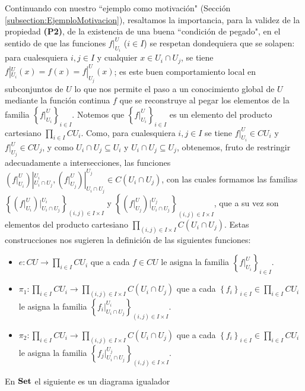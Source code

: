 Continuando con nuestro ``ejemplo como motivación" (Sección \ref{subsection:EjemploMotivacion}), resaltamos la importancia, para la validez de la propiedad \textbf{(P2)}, de la existencia de una buena ``condición de pegado", en el sentido de que las funciones $f|^{U}_{U_i}$ ($i\in I$) se respetan dondequiera que se solapen: para cualesquiera $i,j\in I$ y cualquier $x\in U_i\cap U_j$, se tiene $f|^U_{U_i}(x)=f(x)=f|^U_{U_j}(x)$; es este buen comportamiento local en subconjuntos de $U$ lo que nos permite el paso a un conocimiento global de $U$ mediante la función continua $f$ que se reconstruye al pegar los elementos de la familia $\left\lbrace f|^U_{U_i}\right\rbrace_{i\in I}$. Notemos que $\left\lbrace f|^U_{U_i}\right\rbrace_{i\in I}$ es un elemento del producto cartesiano $\prod_{i\in I} CU_i$. Como, para cualesquiera $i,j\in I$ se tiene $f|^U_{U_i}\in CU_i$ y $f|^U_{U_j}\in CU_j$, y como $U_i\cap U_j\subseteq U_i$ y $U_i\cap U_j\subseteq U_j$, obtenemos, fruto de restringir adecuadamente a intersecciones, las funciones $({f|^U_{U_i}})|^{U_i}_{U_i\cap U_j}, ({f|^U_{U_j}})|^{U_j}_{U_i\cap U_j}\in C(U_i\cap U_j)$, con las cuales formamos las familias $\left\lbrace ({f|^U_{U_i}})|^{U_i}_{U_i\cap U_j}\right\rbrace_{(i,j)\in I\times I}$ y $\left\lbrace ({f|^U_{U_j}})|^{U_j}_{U_i\cap U_j}\right\rbrace_{(i,j)\in I\times I}$, que a su vez son elementos del producto cartesiano $\prod_{(i,j)\in I\times I}C(U_i\cap U_j)$. Estas construcciones nos sugieren la definición de las siguientes funciones:
\begin{itemize}
   \item $e:CU\to \prod_{i\in I}CU_i$ que a cada $f\in CU$ le asigna la familia $\left\lbrace f|^{U}_{U_i}\right\rbrace_{i\in I}$.
   \item $\pi_1:\prod_{i\in I}CU_i\to \prod_{(i,j)\in I\times I}C(U_i\cap U_j)$ que a cada $\left\lbrace f_i\right\rbrace_{i\in I}\in\prod_{i\in I}CU_i$ le asigna la familia $\left\lbrace {f_i}|^{U_i}_{U_i\cap U_j}\right\rbrace_{(i,j)\in I\times I}$.
   \item $\pi_2:\prod_{i\in I}CU_i\to \prod_{(i,j)\in I\times I}C(U_i\cap U_j)$ que a cada $\left\lbrace f_i\right\rbrace_{i\in I}\in\prod_{i\in I}CU_i$ le asigna la familia $\left\lbrace {f_j}|^{U_j}_{U_i\cap U_j}\right\rbrace_{(i,j)\in I\times I}$.
\end{itemize}
\begin{Prop}
   En $\normalfont{\textbf{Set}}$ el siguiente es un diagrama igualador
   
\end{Prop}
